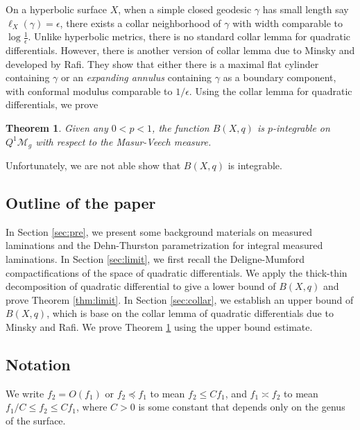 \documentclass{amsart}
\theoremstyle{plain}
\newtheorem{theorem}{Theorem}[section]
\theoremstyle{definition}
\numberwithin{equation}{section}
\begin{document}
On a hyperbolic surface $X$, when a simple closed geodesic $\gamma$ has small length say $\ell_X(\gamma) = \epsilon$,
there exists a collar neighborhood of $\gamma$ with width comparable to $\log \frac{1}{\epsilon}$. Unlike hyperbolic metrics, there is no standard collar lemma for quadratic differentials. However, there is another version of collar lemma due to Minsky and developed by Rafi.
They show that either there is a maximal flat cylinder containing $\gamma$ or
 an \emph{expanding annulus} containing $\gamma$ as a boundary component, with conformal modulus comparable to
$1/\epsilon$.
Using the collar lemma for quadratic differentials, we prove 
 
\begin{theorem} \label{thm:int} 
Given any $0<p<1$, 
the function $B(X,q)$ is $p$-integrable on $Q^1\mathcal{M}_{g}$ with respect to the Masur-Veech measure. 
\end{theorem}

Unfortunately, we are not able show that $B(X,q)$ is integrable. 


\subsection*{Outline of the paper}
In Section \ref{sec:pre}, we present some background materials on measured laminations and the Dehn-Thurston parametrization for  integral measured laminations. In Section \ref{sec:limit}, we first recall the Deligne-Mumford compactifications of the space of quadratic differentials. We apply the thick-thin decomposition of quadratic differential to give a lower bound of $B(X,q)$
and prove Theorem \ref{thm:limit}. In Section \ref{sec:collar},
we establish an upper bound of $B(X,q)$, which is base on the collar lemma of quadratic differentials due to Minsky and Rafi. 
We prove Theorem \ref{thm:int} using the upper bound estimate. 



\subsection*{Notation} We write $f_2 = O(f_1)$ or $f_2 \preceq f_1$ to mean $f_2 \leq C f_1$, and 
$f_1 \asymp f_2$ to mean $f_1/C \leq f_2 \leq C f_1$, where $C>0$ is some constant that
depends only on the genus of the surface. 
\end{document}

